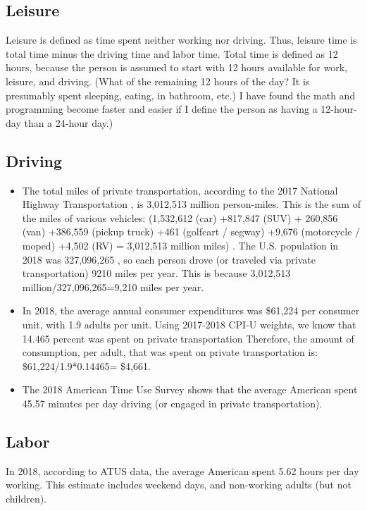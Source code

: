 \documentclass[letter, 12pt, epsf,leqno]{article}
\begin{document}
\subsection{Leisure}
Leisure is defined as time spent neither working nor driving.  Thus, leisure time is total time minus the driving time and labor time.  Total time is defined as 12 hours, because the person is assumed to start with 12 hours available for work, leisure, and driving.  (What of the remaining 12 hours of the day?  It is presumably spent sleeping, eating, in bathroom, etc.)  I have found the math and programming become faster and easier if I define the person as having a 12-hour-day than a 24-hour day.) %

\subsection{Driving}
\begin{itemize}
\item The total miles of private transportation, according to the 2017 National Highway Transportation , is 3,012,513 million person-miles.  This is the sum of the miles of various vehicles: (1,532,612 (car) +817,847 (SUV) + 260,856 (van) +386,559 (pickup truck) +461 (golfcart / segway) +9,676 (motorcycle / moped) +4,502 (RV) = 3,012,513 million miles) \citep{transportation}.  The U.S. population in 2018 was 327,096,265 \citep{macrotrends_population}, so each person drove (or traveled via private transportation) 9210 miles per year.  This is because 3,012,513 million/327,096,265=9,210 miles per year.


\item In 2018, the average annual consumer expenditures was \$61,224 per consumer unit, with 1.9 adults per unit. \citep{expenditures}  Using 2017-2018 CPI-U weights, we know that 14.465 percent was spent on private transportation \citep{cpi}  Therefore, the amount of consumption, per adult, that was spent on private transportation is: \$61,224/1.9*0.14465= \$4,661.

\item  The 2018 American Time Use Survey shows that the average American spent 45.57 minutes per day driving (or engaged in private transportation).%
\end{itemize}


\subsection{Labor} In 2018, according to ATUS data, the average American spent 5.62 hours per day working.  This estimate includes weekend days, and non-working adults (but not children). %
\end{document}
